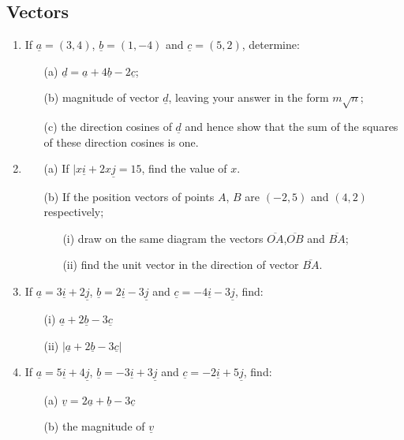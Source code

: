 	\subsection{Vectors}
\begin{enumerate}



	\item If $\underline{a} = (3,4)$, $\underline{b} = (1,-4)$ and $\underline{c} = (5,2)$, determine:
		\begin{itemize}
		\item[(a)] $\underline{d} = \underline{a} + 4\underline{b} - 2\underline{c}$;
		\item[(b)] magnitude of vector $\underline{d}$, leaving your answer in the form $m\sqrt{n}$;
		\item[(c)] the direction cosines of $\underline{d}$ and hence show that the sum of the squares of these direction cosines is one.
		\end{itemize}
		
	\item 
		\begin{itemize}
		\item[(a)] If $|x\underline{i} + 2x\underline{j} = 15$, find the value of $x$.	
		\item[(b)] If the position vectors of points $A$, $B$ are $(-2,5)$ and $(4,2)$ respectively;
			\begin{itemize}
			\item[(i)] draw on the same diagram the vectors $\overline{OA}$,$\overline{OB}$ and $\overline{BA}$; 
			\item[(ii)] find the unit vector in the direction of vector $\overline{BA}$.
			\end{itemize}
		\end{itemize}

	\item If $\underline{a} = 3\underline{i} + 2\underline{j}$, $\underline{b} = 2\underline{i} - 3\underline{j}$ and $\underline{c} = -4\underline{i} -3 \underline{j}$, find:
		\begin{itemize}
		\item[(i)] $\underline{a} + 2\underline{b} - 3\underline{c}$
		\item[(ii)] $|\underline{a} + 2\underline{b} - 3\underline{c}|$
		\end{itemize}
		
	\item If $\underline{a} = 5\underline{i} + 4\underline{j}$, $\underline{b} = -3\underline{i} + 3\underline{j}$ and $\underline{c} = -2\underline{i} + 5\underline{j}$, find:
		\begin{itemize}
		\item[(a)] $\underline{v} = 2\underline{a} + \underline{b} - 3\underline{c}$
		\item[(b)] the magnitude of $\underline{v}$
		\end{itemize}
		

\end{enumerate}
